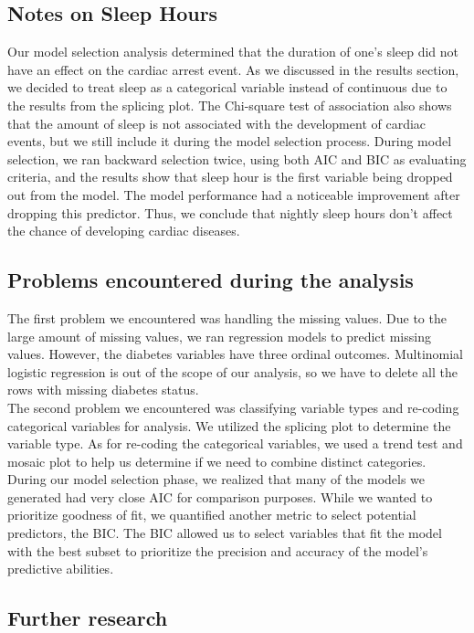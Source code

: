 \documentclass[12pt]{article}
\begin{document}
\subsection*{Notes on Sleep Hours}
Our model selection analysis determined that the duration of one’s sleep did not have an effect on the cardiac arrest event. As we discussed in the results section, we decided to treat sleep as a categorical variable instead of continuous due to the results from the splicing plot. The Chi-square test of association also shows that the amount of sleep is not associated with the development of cardiac events, but we still include it during the model selection process. During model selection, we ran backward selection twice, using both AIC and BIC as evaluating criteria, and the results show that sleep hour is the first variable being dropped out from the model. The model performance had a noticeable improvement after dropping this predictor. Thus, we conclude that nightly sleep hours don't affect the chance of developing cardiac diseases.

\subsection*{Problems encountered during the analysis}
The first problem we encountered was handling the missing values. Due to the large amount of missing values, we ran regression models to predict missing values. However, the diabetes variables have three ordinal outcomes. Multinomial logistic regression is out of the scope of our analysis, so we have to delete all the rows with missing diabetes status.\\
The second problem we encountered was classifying variable types and re-coding categorical variables for analysis. We utilized the splicing plot to determine the variable type. As for re-coding the categorical variables, we used a trend test and mosaic plot to help us determine if we need to combine distinct categories.\\
During our model selection phase, we realized that many of the models we generated had very close AIC for comparison purposes. While we wanted to prioritize goodness of fit, we quantified another metric to select potential predictors, the BIC. The BIC allowed us to select variables that fit the model with the best subset to prioritize the precision and accuracy of the model’s predictive abilities. 

	
\subsection*{Further research}
\end{document}
